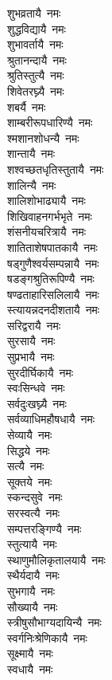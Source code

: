 \begin{multicols}{\maxColumns}
\begin{flushleft}
शुभव्रतायै~नमः\\
शुद्धविद्यायै~नमः\\
शुभावर्तायै~नमः\\
श्रुतानन्दायै~नमः\\
श्रुतिस्तुत्यै~नमः\\
शिवेतरघ्न्यै~नमः\hfill{}\\
शबर्यै~नमः\\
शाम्बरीरूपधारिण्यै~नमः\\
श्मशानशोधन्यै~नमः\\
शान्तायै~नमः\\
शश्वच्छतधृतिस्तुतायै~नमः\\
शालिन्यै~नमः\\
शालिशोभाढ्यायै~नमः\\
शिखिवाहनगर्भभृते~नमः\\
शंसनीयचरित्रायै~नमः\\
शातिताशेषपातकायै~नमः\hfill{}\\
षड्गुणैश्वर्यसम्पन्नायै~नमः\\
षडङ्गश्रुतिरूपिण्यै~नमः\\
षण्ढताहारिसलिलायै~नमः\\
स्त्यायन्नदनदीशतायै~नमः\\
सरिद्वरायै~नमः\\
सुरसायै~नमः\\
सुप्रभायै~नमः\\
सुरदीर्घिकायै~नमः\\
स्वःसिन्धवे~नमः\\
सर्वदुःखघ्न्यै~नमः\hfill{}\\
सर्वव्याधिमहौषधायै~नमः\\
सेव्यायै~नमः\\
सिद्धये~नमः\\
सत्यै~नमः\\
सूक्तये~नमः\\
स्कन्दसुवे~नमः\\
सरस्वत्यै~नमः\\
सम्पत्तरङ्गिण्यै~नमः\\
स्तुत्यायै~नमः\\
स्थाणुमौलिकृतालयायै~नमः\hfill{}\\
स्थैर्यदायै~नमः\\
सुभगायै~नमः\\
सौख्यायै~नमः\\
स्त्रीषुसौभाग्यदायिन्यै~नमः\\
स्वर्गनिःश्रेणिकायै~नमः\\
सूक्ष्मायै~नमः\\
स्वधायै~नमः\\

\end{flushleft}
\end{multicols}
